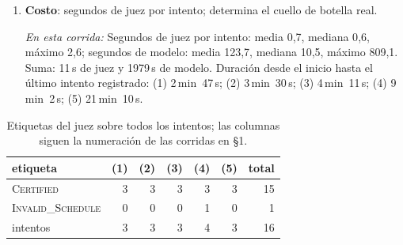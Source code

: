 \documentclass[11pt,a4paper]{article}
\begin{document}
\begin{enumerate}
  \emph{En esta corrida:} Tabla~\ref{tab:comparacion}. Los enunciados de $V_G$ y $V_I$ no coinciden, así que la comparación es indirecta.

  \item \textbf{Costo}: segundos de juez por intento; determina el cuello de botella real.

  \emph{En esta corrida:} Segundos de juez por intento: media 0{,}7, mediana 0{,}6, máximo 2{,}6; segundos de modelo: media 123{,}7, mediana 10{,}5, máximo 809{,}1. Suma: 11\,s de juez y 1979\,s de modelo. Duración desde el inicio hasta el último intento registrado: (1) 2\,min~47\,s; (2) 3\,min~30\,s; (3) 4\,min~11\,s; (4) 9\,min~2\,s; (5) 21\,min~10\,s.

\end{enumerate}

\begin{table}[!ht]
\centering
\footnotesize
\setlength{\tabcolsep}{4pt}
\begin{tabular}{@{}lrrrrrr@{}}
\toprule
etiqueta & (1) & (2) & (3) & (4) & (5) & total \\
\midrule
\textsc{Certified} & 3 & 3 & 3 & 3 & 3 & 15 \\
\textsc{Invalid\_Schedule} & 0 & 0 & 0 & 1 & 0 & 1 \\
intentos & 3 & 3 & 3 & 4 & 3 & 16 \\
\bottomrule
\end{tabular}
\caption{Etiquetas del juez sobre todos los intentos; las columnas siguen la numeración de las corridas en §1.}
\label{tab:etiquetas}
\end{table}
\end{document}
